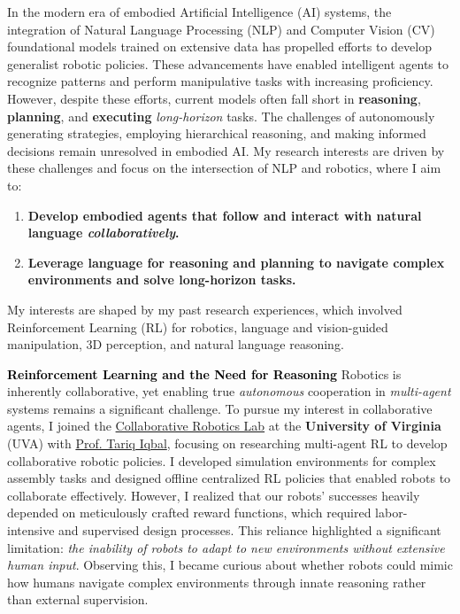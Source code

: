 \documentclass[10pt]{article}
\newcommand{\statement}[1]{\medskip\noindent
  \textcolor{black}{\textbf{#1}}\space
}
\begin{document}
\noindent In the modern era of embodied Artificial Intelligence (AI) systems, the integration of Natural Language Processing (NLP) and Computer Vision (CV) foundational models trained on extensive data has propelled efforts to develop generalist robotic policies. These advancements have enabled intelligent agents to recognize patterns and perform manipulative tasks with increasing proficiency. However, despite these efforts, current models often fall short in \textbf{reasoning}, \textbf{planning}, and \textbf{executing} \textit{long-horizon} tasks. The challenges of autonomously generating strategies, employing hierarchical reasoning, and making informed decisions remain unresolved in embodied AI. My research interests are driven by these challenges and focus on the intersection of NLP and robotics, where I aim to:
\begin{enumerate}[label=(\arabic*), itemindent=0pt, itemsep=0pt, parsep=0pt, nosep]
  \item \textbf{Develop embodied agents that follow and interact with natural language \textit{collaboratively}.}
  \item \textbf{Leverage language for reasoning and planning to navigate complex environments and solve long-horizon tasks.}
\end{enumerate}
My interests are shaped by my past research experiences, which involved Reinforcement Learning (RL) for robotics, language and vision-guided manipulation, 3D perception, and natural language reasoning.

\statement{Reinforcement Learning and the Need for Reasoning} Robotics is inherently collaborative, yet enabling true \textit{autonomous} cooperation in \textit{multi-agent} systems remains a significant challenge. To pursue my interest in collaborative agents, I joined the \href{https://www.collabrobotics.com/}{Collaborative Robotics Lab} at the \textbf{University of Virginia} (UVA) with  \href{https://www.tiqbal.com/}{Prof. Tariq Iqbal}, focusing on researching multi-agent RL to develop collaborative robotic policies. I developed simulation environments for complex assembly tasks and designed offline centralized RL policies that enabled robots to collaborate effectively. However, I realized that our robots' successes heavily depended on meticulously crafted reward functions, which required labor-intensive and supervised design processes. This reliance highlighted a significant limitation: \textit{the inability of robots to adapt to new environments without extensive human input}. Observing this, I became curious about whether robots could mimic how humans navigate complex environments through innate reasoning rather than external supervision.
\end{document}
